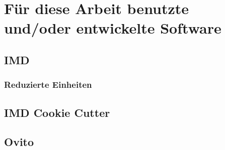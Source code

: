 \chapter{Für diese Arbeit benutzte und/oder entwickelte Software}



\section{IMD}
    \subsection{Reduzierte Einheiten}


\section{IMD Cookie Cutter}


\section{Ovito}